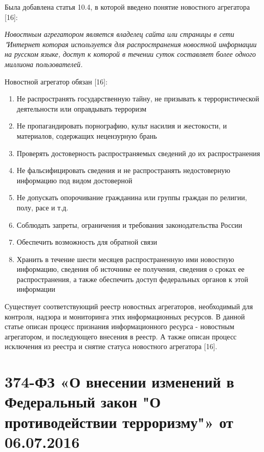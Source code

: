 \documentclass[14pt,a4paper,report]{article}
\begin{document}
Была добавлена статья 10.4, в которой введено понятие новостного агрегатора [16]:

\begin{displayquote}
	\emph{Новостным агрегатором является владелец сайта или страницы в сети "Интернет которая используется для распространения новостной информации на русском языке, доступ к которой в течении суток составляет более одного миллиона пользователей.}
\end{displayquote}

Новостной агрегатор обязан [16]:

\begin{enumerate}
	\item Не распространять государственную тайну, не призывать к террористической деятельности или оправдывать терроризм
	\item Не пропагандировать порнографию, культ насилия и жестокости, и материалов, содержащих нецензурную брань
	\item Проверять достоверность распространяемых сведений до их распространения
	\item Не фальсифицировать сведения и не распространять недостоверную информацию под видом достоверной
	\item Не допускать опорочивание гражданина или группы граждан по религии, полу, расе и т.д.
	\item Соблюдать запреты, ограничения и требования законодательства России
	\item Обеспечить возможность для обратной связи
	\item Хранить в течение шести месяцев распространенную ими новостную информацию, сведения об источнике ее получения, сведения о сроках ее распространения, а также обеспечить доступ федеральных органов к этой информации
\end{enumerate}

Существует соответствующий реестр новостных агрегаторов, необходимый для контроля, надзора и мониторинга этих информационных ресурсов. В данной статье описан процесс признания информационного ресурса - новостным агрегатором, и последующего внесения в реестр. А также описан процесс исключения из реестра и снятие статуса новостного агрегатора [16].

\section{374-ФЗ «О внесении изменений в Федеральный закон "О противодействии терроризму"» от 06.07.2016}
\end{document}
